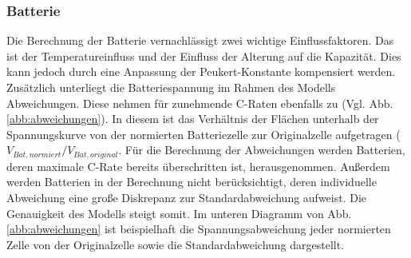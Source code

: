 \subsubsection{Batterie}
Die Berechnung der Batterie vernachlässigt zwei wichtige Einflussfaktoren. Das ist der Temperatureinfluss und der Einfluss der Alterung auf die Kapazität. Dies kann jedoch durch eine Anpassung der Peukert-Konstante kompensiert werden.\\
Zusätzlich unterliegt die Batteriespannung im Rahmen des Modells Abweichungen. Diese nehmen für zunehmende C-Raten ebenfalls zu (Vgl. Abb. \ref{abb:abweichungen}). In diesem ist das Verhältnis der Flächen unterhalb der Spannungskurve von der normierten Batteriezelle zur Originalzelle aufgetragen (\ensuremath{V_{Bat,normiert}/V_{Bat,original}}. Für die Berechnung der Abweichungen werden Batterien, deren maximale C-Rate bereits überschritten ist, herausgenommen. Außerdem werden Batterien in der Berechnung nicht berücksichtigt, deren individuelle Abweichung eine große Diskrepanz zur Standardabweichung aufweist. Die Genauigkeit des Modells steigt somit. Im unteren Diagramm von Abb. \ref{abb:abweichungen} ist beispielhaft die Spannungsabweichung jeder normierten Zelle von der Originalzelle sowie die Standardabweichung dargestellt.
